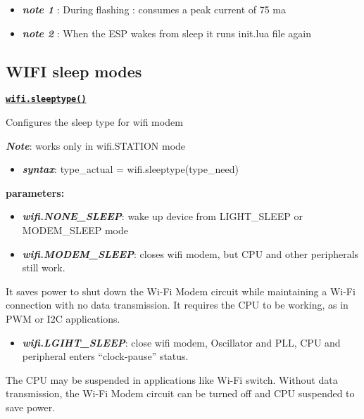 \documentclass[16pt]{article}
\begin{document}
\begin{itemize}

\item
  \textbf{\emph{note 1}} : During flashing : consumes a peak current of 75
  ma
\item
  \textbf{\emph{note 2}} : When the ESP wakes from sleep it runs init.lua file again
\end{itemize}

\vspace{0.5cm}
\subsection{WIFI sleep modes}

\vspace{0.5cm}
{\underline{\texttt{\textbf{wifi.sleeptype()}}}}


\vspace{0.1cm}
  Configures the sleep type for wifi modem


\textbf{\emph{Note}}: works only in wifi.STATION mode

\begin{itemize}

\item
  \textbf{\emph{syntax}}: type\_actual = wifi.sleeptype(type\_need)
\end{itemize}

  \textbf{parameters:}

\begin{itemize}
\item
  \textbf{\emph{wifi.NONE\_SLEEP}}: wake up device from LIGHT\_SLEEP or MODEM\_SLEEP
  mode
\item
  \textbf{\emph{wifi.MODEM\_SLEEP}}: closes wifi modem, but CPU and other peripherals
  still work.
\end{itemize}

It saves power to shut down the Wi-Fi Modem circuit while maintaining a
Wi-Fi connection with no data transmission. It requires the CPU to be
working, as in PWM or I2C applications.

\begin{itemize}

\item
  \textbf{\emph{wifi.LGIHT\_SLEEP}}: close wifi modem, Oscillator and PLL, CPU and
  peripheral enters ``clock-pause'' status.
\end{itemize}

The CPU may be suspended in applications like Wi-Fi switch. Without data
transmission, the Wi-Fi Modem circuit can be turned off and CPU
suspended to save power.
\end{document}
